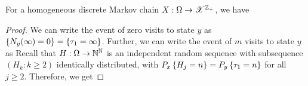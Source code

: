 \documentclass[letterpaper,10pt,english]{article}
\begin{document}
\begin{prop} 
For a homogeneous discrete Markov chain $X: \Omega \to \mathscr{X}^{\mathbb{Z}_+}$, 
we have 
\end{prop}
\begin{proof} 
We can write the event of zero visits to state $y$ as $\left\{N_y(\infty) = 0\right\} = \left\{\tau_1 = \infty\right\}$. 
Further, we can write the event of $m$ visits to state $y$ as 
Recall that $H:\Omega\to\mathbb{N}^{\mathbb{N}}$ is an independent random sequence with subsequence $(H_k: k \ge 2)$ identically distributed, 
with $P_x\left\{H_j = n\right\} = P_y\left\{\tau_1 =n\right\}$ for all $j \ge 2$.  
Therefore, we get 
\end{proof}
\end{document}
